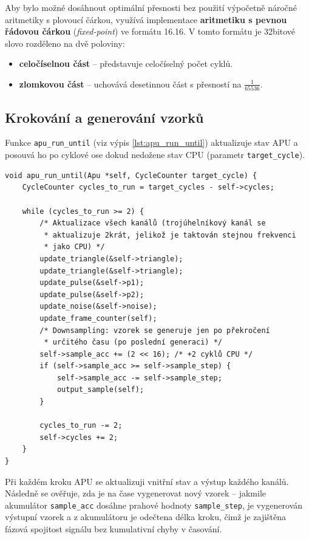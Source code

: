 Aby bylo možné dosáhnout optimální přesnosti bez použití výpočetně náročné aritmetiky s plovoucí čárkou,
využívá implementace \textbf{aritmetiku s pevnou řádovou čárkou} (\textit{fixed-point}) ve formátu
16.16. V tomto formátu je 32bitové slovo rozděleno na dvě poloviny:

\begin{itemize}
    \item \textbf{celočíselnou část} -- představuje celočíselný počet cyklů.
    \item \textbf{zlomkovou část} -- uchovává desetinnou část s přesností na $\frac{1}{65536}$.
\end{itemize}

\subsection{Krokování a generování vzorků}

Funkce \texttt{apu\_run\_until} (viz výpis \ref{lst:apu_run_until}) aktualizuje stav APU a posouvá
ho po cyklové ose dokud nedožene stav CPU (parametr \texttt{target\_cycle}).

\begin{listing}[htbp]
\begin{verbatim}
void apu_run_until(Apu *self, CycleCounter target_cycle) {
    CycleCounter cycles_to_run = target_cycles - self->cycles;

    while (cycles_to_run >= 2) {
        /* Aktualizace všech kanálů (trojúhelníkový kanál se
         * aktualizuje 2krát, jelikož je taktován stejnou frekvenci
         * jako CPU) */
        update_triangle(&self->triangle);
        update_triangle(&self->triangle);
        update_pulse(&self->p1);
        update_pulse(&self->p2);
        update_noise(&self->noise);
        update_frame_counter(self);
        /* Downsampling: vzorek se generuje jen po překročení
         * určitého času (po poslední generaci) */
        self->sample_acc += (2 << 16); /* +2 cyklů CPU */
        if (self->sample_acc >= self->sample_step) {
            self->sample_acc -= self->sample_step;
            output_sample(self);
        }

        cycles_to_run -= 2;
        self->cycles += 2;
    }
}
\end{verbatim}
\caption{Aktualizace stavu APU.}
\label{lst:apu_run_until}
\end{listing}

Při každém kroku APU se aktualizuji vnitřní stav a výstup každého kanálů. Následně se ověřuje, zda
je na čase vygenerovat nový vzorek -- jakmile akumulátor \texttt{sample\_acc} dosáhne prahové
hodnoty \texttt{sample\_step}, je vygenerován výstupní vzorek a z akumulátoru je odečtena délka
kroku, čimž je zajištěna fázová spojitost signálu bez kumulativní chyby v časování.

